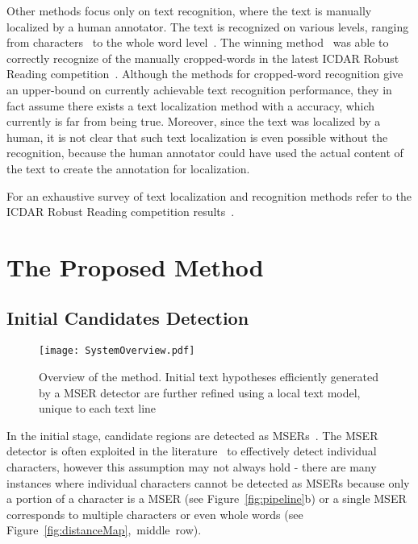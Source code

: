 \documentclass[conference]{IEEEtran}
\begin{document}
Other methods focus only on text recognition, where the text is manually localized by a human annotator. The text is recognized on various levels, ranging from characters~\cite{Iwamura2013} to the whole word level~\cite{photoocr,yao2013strokelets,leeregion}. The winning method~\cite{photoocr} was able to correctly recognize  of the manually cropped-words in the latest ICDAR Robust Reading competition~\cite{ICDAR2013}. Although the methods for cropped-word recognition give an upper-bound on currently achievable text recognition performance, they in fact assume there exists a text localization method with a  accuracy, which currently is far from being true. Moreover, since the text was localized by a human, it is not clear that such text localization is even possible without the recognition, because the human annotator could have used the actual content of the text to create the annotation for localization.

For an exhaustive survey of text localization and recognition methods refer to the ICDAR Robust Reading competition results~\cite{ICDAR2013}.



\vspace{-10pt}
\section{The Proposed Method}
\label{sec:proposedMethod}
\subsection{Initial Candidates Detection}
\label{sec:initialCandidateDetection}

\begin{figure}
\centering
\texttt{[image: SystemOverview.pdf]}
\caption{Overview of the method. Initial text hypotheses efficiently generated by a MSER detector are further refined using a local text model, unique to each text line}
\label{fig:methodoverview}
\vspace{-15pt}
\end{figure}

In the initial stage, candidate regions are detected as MSERs~\cite{Matas-MSER}. The MSER detector is often exploited in the literature~\cite{Yin-TPAMI2013,Neumann-ACCV10} to effectively detect individual characters, however this assumption may not always hold - there are many instances where individual characters cannot be detected as MSERs because only a portion of a character is a MSER (see Figure~\ref{fig:pipeline}b) or a single MSER corresponds to multiple characters or even whole words (see Figure~\ref{fig:distanceMap},~middle~row).
\end{document}
